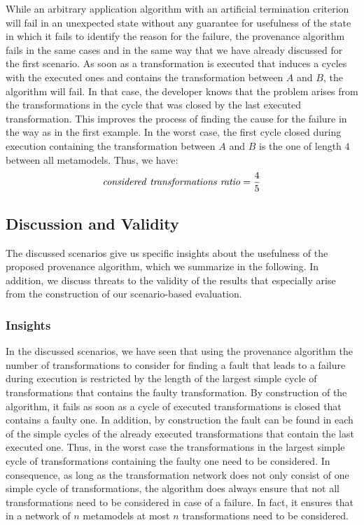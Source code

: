 While an arbitrary application algorithm with an artificial termination criterion will fail in an unexpected state without any guarantee for usefulness of the state in which it fails to identify the reason for the failure, the provenance algorithm fails in the same cases and in the same way that we have already discussed for the first scenario.
As soon as a transformation is executed that induces a cycles with the executed ones and contains the transformation between $A$ and $B$, the algorithm will fail.
In that case, the developer knows that the problem arises from the transformations in the cycle that was closed by the last executed transformation.
This improves the process of finding the cause for the failure in the way as in the first example.
In the worst case, the first cycle closed during execution containing the transformation between $A$ and $B$ is the one of length $4$ between all metamodels.
Thus, we have:
\begin{align*}
    \mathit{considered\ transformations\ ratio} = \frac{4}{5}
\end{align*}


\subsection{Discussion and Validity}
\label{chap:correctness_evaluation:orchestration:discussion}

The discussed scenarios give us specific insights about the usefulness of the proposed provenance algorithm, which we summarize in the following.
In addition, we discuss threats to the validity of the results that especially arise from the construction of our scenario-based evaluation.

\subsubsection{Insights}

In the discussed scenarios, we have seen that using the provenance algorithm the number of transformations to consider for finding a fault that leads to a failure during execution is restricted by the length of the largest simple cycle of transformations that contains the faulty transformation.
By construction of the algorithm, it fails as soon as a cycle of executed transformations is closed that contains a faulty one.
In addition, by construction the fault can be found in each of the simple cycles of the already executed transformations that contain the last executed one.
Thus, in the worst case the transformations in the largest simple cycle of transformations containing the faulty one need to be considered.
In consequence, as long as the transformation network does not only consist of one simple cycle of transformations, the algorithm does always ensure that not all transformations need to be considered in case of a failure.
In fact, it ensures that in a network of $n$ metamodels at most $n$ transformations need to be considered.

